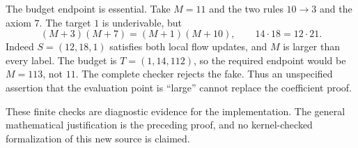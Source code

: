 The budget endpoint is essential.  Take $M=11$ and the two rules
$10\longrightarrow3$ and the axiom $7$.
The target $1$ is underivable, but
\[
 (M+3)(M+7)=(M+1)(M+10),\qquad 14\cdot18=12\cdot21.
\]
Indeed $S=(12,18,1)$ satisfies both local flow updates, and $M$ is larger
than every label.  The budget is $T=(1,14,112)$, so the required endpoint
would be $M=113$, not $11$.  The complete checker rejects the fake.
Thus an unspecified assertion that the evaluation point is ``large''
cannot replace the coefficient proof.

These finite checks are diagnostic evidence for the implementation.
The general mathematical justification is the preceding proof, and no
kernel-checked formalization of this new source is claimed.

